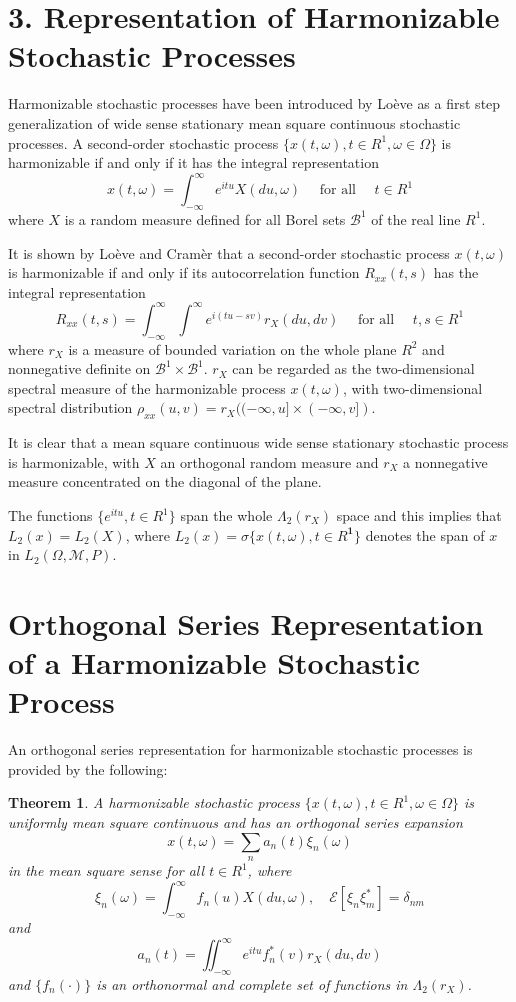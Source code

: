 \documentclass{article}
\newtheorem{theorem}{Theorem}
\begin{document}
\section*{3. Representation of Harmonizable Stochastic Processes}

Harmonizable stochastic processes have been introduced by Lo\`{e}ve \cite{loeve1963} as a first step generalization of wide sense stationary mean square continuous stochastic processes. A second-order stochastic process $\{x(t, \omega), t \in R^{1}, \omega \in \Omega\}$ is harmonizable if and only if it has the integral representation
\[
x(t, \omega)=\int_{-\infty}^{\infty} e^{i t u} X(d u, \omega) \quad \text { for all } \quad t \in R^{1}
\]
where $X$ is a random measure defined for all Borel sets $\mathscr{B}^{1}$ of the real line $R^{1}$.

It is shown by Lo\`{e}ve \cite{loeve1963} and Cram\`{e}r \cite{cramer1951} that a second-order stochastic process $x(t, \omega)$ is harmonizable if and only if its autocorrelation function $R_{x x}(t, s)$ has the integral representation
\[
R_{x x}(t, s)=\int_{-\infty}^{\infty} \int^{\infty} e^{i(t u-s v)} r_{X}(d u, d v) \quad \text { for all } \quad t, s \in R^{1}
\]
where $r_{X}$ is a measure of bounded variation on the whole plane $R^{2}$ and nonnegative definite on $\mathscr{B}^{1} \times \mathscr{B}^{1}$. $r_{X}$ can be regarded as the two-dimensional spectral measure of the harmonizable process $x(t, \omega)$, with two-dimensional spectral distribution $\rho_{x x}(u, v)=r_{X}((-\infty, u] \times(-\infty, v])$.

It is clear that a mean square continuous wide sense stationary stochastic process is harmonizable, with $X$ an orthogonal random measure and $r_{X}$ a nonnegative measure concentrated on the diagonal of the plane.

The functions $\{e^{i t u}, t \in R^{1}\}$ span the whole $\Lambda_{2}(r_{X})$ space and this implies that $L_{2}(x)=L_{2}(X)$, where $L_{2}(x)=\sigma\{x(t, \omega), t \in R^{\mathbf{1}}\}$ denotes the span of $x$ in $L_{2}(\Omega, \mathscr{M}, P)$.

\section*{Orthogonal Series Representation of a Harmonizable Stochastic Process}

An orthogonal series representation for harmonizable stochastic processes is provided by the following:

\begin{theorem}
A harmonizable stochastic process $\{x(t, \omega), t \in R^{1}, \omega \in \Omega\}$ is uniformly mean square continuous and has an orthogonal series expansion
\[
x(t, \omega)=\sum_{n} a_{n}(t) \xi_{n}(\omega)
\]
in the mean square sense for all $t \in R^{1}$, where
\[
\xi_{n}(\omega)=\int_{-\infty}^{\infty} f_{n}(u) X(d u, \omega), \quad \mathscr{E}[\xi_{n} \xi_{m}^{*}]=\delta_{n m}
\]
and
\[
a_{n}(t)=\iint_{-\infty}^{\infty} e^{i t u} f_{n}^{*}(v) r_{X}(d u, d v)
\]
and $\{f_{n}(\cdot)\}$ is an orthonormal and complete set of functions in $\Lambda_{2}(r_{X})$.
\end{theorem}
\end{document}
